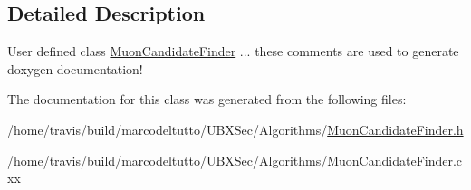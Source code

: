 \subsection{Detailed Description}
User defined class \hyperlink{classubana_1_1MuonCandidateFinder}{Muon\-Candidate\-Finder} ... these comments are used to generate doxygen documentation! 

The documentation for this class was generated from the following files\-:\begin{DoxyCompactItemize}
\item 
/home/travis/build/marcodeltutto/\-U\-B\-X\-Sec/\-Algorithms/\hyperlink{MuonCandidateFinder_8h}{Muon\-Candidate\-Finder.\-h}\item 
/home/travis/build/marcodeltutto/\-U\-B\-X\-Sec/\-Algorithms/Muon\-Candidate\-Finder.\-cxx\end{DoxyCompactItemize}
